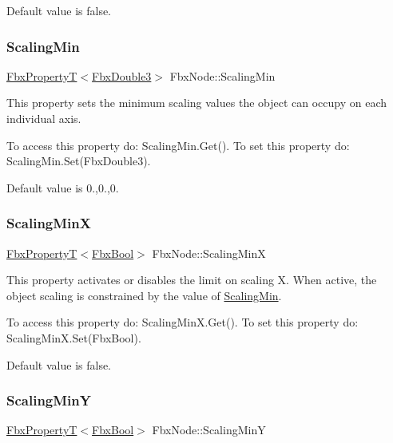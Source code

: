Default value is false. \mbox{\label{class_fbx_node_a90124619387dc0d2f078d4301cffb4d9}} 
\subsubsection{\texorpdfstring{Scaling\+Min}{ScalingMin}}
{\footnotesize\ttfamily \hyperlink{class_fbx_property_t}{Fbx\+PropertyT}$<$\hyperlink{fbxtypes_8h_ae0a96f14cde566774c7553aa7523b7a7}{Fbx\+Double3}$>$ Fbx\+Node\+::\+Scaling\+Min}

This property sets the minimum scaling values the object can occupy on each individual axis.

To access this property do\+: Scaling\+Min.\+Get(). To set this property do\+: Scaling\+Min.\+Set(\+Fbx\+Double3).

Default value is 0.,0.,0. \mbox{\label{class_fbx_node_ad47427b4a9e01ab8e08a0a589a0f1c43}} 
\subsubsection{\texorpdfstring{Scaling\+MinX}{ScalingMinX}}
{\footnotesize\ttfamily \hyperlink{class_fbx_property_t}{Fbx\+PropertyT}$<$\hyperlink{fbxtypes_8h_a92e0562b2fe33e76a242f498b362262e}{Fbx\+Bool}$>$ Fbx\+Node\+::\+Scaling\+MinX}

This property activates or disables the limit on scaling X. When active, the object scaling is constrained by the value of \hyperlink{class_fbx_node_a90124619387dc0d2f078d4301cffb4d9}{Scaling\+Min}.

To access this property do\+: Scaling\+Min\+X.\+Get(). To set this property do\+: Scaling\+Min\+X.\+Set(\+Fbx\+Bool).

Default value is false. \mbox{\label{class_fbx_node_ac152b4cc6a615ef0e98b802807f060da}} 
\subsubsection{\texorpdfstring{Scaling\+MinY}{ScalingMinY}}
{\footnotesize\ttfamily \hyperlink{class_fbx_property_t}{Fbx\+PropertyT}$<$\hyperlink{fbxtypes_8h_a92e0562b2fe33e76a242f498b362262e}{Fbx\+Bool}$>$ Fbx\+Node\+::\+Scaling\+MinY}

